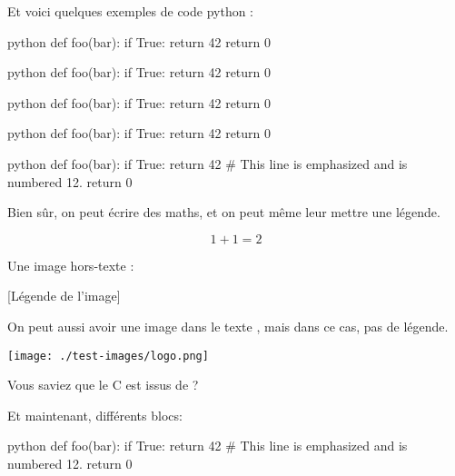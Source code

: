 \documentclass[small]{zmdocument}
\begin{document}
Et voici quelques exemples de code python :

\begin{CodeBlock}{python}
def foo(bar):
    if True:
        return 42
    return 0
\end{CodeBlock}

\begin{CodeBlock}{python}
def foo(bar):
    if True:
        return 42
    return 0
\end{CodeBlock}

\begin{CodeBlock}{python}
def foo(bar):
    if True:
        return 42
    return 0
\end{CodeBlock}

\begin{CodeBlock}[][1, 3-4]{python}
def foo(bar):
    if True:
        return 42
    return 0
\end{CodeBlock}

\begin{CodeBlock}[][12][10]{python}
def foo(bar):
    if True:
        return 42 # This line is emphasized and is numbered 12.
    return 0
\end{CodeBlock}

Bien sûr, on peut écrire des maths, et on peut même leur mettre une légende.

\[
   1 + 1 = 2
\]

Une image hors-texte :

[Légende de l’image]

On peut aussi avoir une image dans le texte , mais dans ce cas, pas de légende.

\begin{center}
\texttt{[image: ./test-images/logo.png]}
\end{center}

Vous saviez que le C est issus de  ?


Et maintenant, différents blocs:

\begin{Information}
\blindtext
\begin{Question}
\blindtext
\end{Question}
\end{Information}

\begin{Question}
\blindtext
\begin{CodeBlock}[][12][10]{python}
def foo(bar):
    if True:
        return 42 # This line is emphasized and is numbered 12.
    return 0
\end{CodeBlock}
\blindtext
\end{Question}
\end{document}
